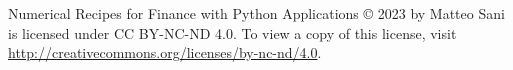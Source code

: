 \begin{minipage}{0.75\textwidth}
Numerical Recipes for Finance with Python Applications © 2023 by Matteo Sani is licensed under CC BY-NC-ND 4.0. To view a copy of this license, visit \href{http://creativecommons.org/licenses/by-nc-nd/4.0}{http://creativecommons.org/licenses/by-nc-nd/4.0}.
\end{minipage}

